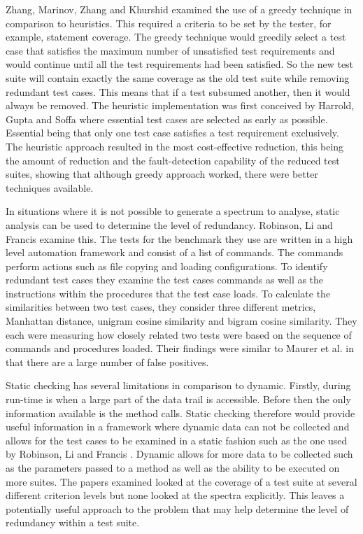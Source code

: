 Zhang, Marinov, Zhang and Khurshid \cite{zhang2011empirical} examined the use of a greedy technique in comparison to heuristics. This required a criteria to be set by the tester, for example, statement coverage. The greedy technique would greedily select a test case that satisfies the maximum number of unsatisfied test requirements and would continue until all the test requirements had been satisfied. So the new test suite will contain exactly the same coverage as the old test suite while removing redundant test cases. This means that if a test subsumed another, then it would always be removed. The heuristic implementation was first conceived by Harrold, Gupta and Soffa \cite{harrold1993methodology} where essential test cases are selected as early as possible. Essential being that only one test case satisfies a test requirement exclusively. The heuristic approach resulted in the most cost-effective reduction, this being the amount of reduction and the fault-detection capability of the reduced test suites, showing that although greedy approach worked, there were better techniques available.

In situations where it is not possible to generate a spectrum to analyse, static analysis can be used to determine the level of redundancy. Robinson, Li and Francis \cite{li2008static} examine this. The tests for the benchmark they use are written in a high level automation framework and consist of a list of commands. The commands perform actions such as file copying and loading configurations. To identify redundant test cases they examine the test cases commands as well as the instructions within the procedures that the test case loads. To calculate the similarities between two test cases, they consider three different metrics, Manhattan distance, unigram cosine similarity and bigram cosine similarity. They each were measuring how closely related two tests were based on the sequence of commands and procedures loaded. Their findings were similar to Maurer et al. \cite{koochakzadeh2009test} in that there are a large number of false positives.

Static checking has several limitations in comparison to dynamic. Firstly, during run-time is when a large part of the data trail is accessible. Before then the only information available is the method calls.  Static checking therefore would provide useful information in a framework where dynamic data can not be collected and allows for the test cases to be examined in a static fashion such as the one used by Robinson, Li and Francis \cite{li2008static}. Dynamic allows for more data to be collected such as the parameters passed to a method as well as the ability to be executed on more suites. The papers examined looked at the coverage of a test suite at several different criterion levels but none looked at the spectra explicitly. This leaves a potentially useful approach to the problem that may help determine the level of redundancy within a test suite. 

